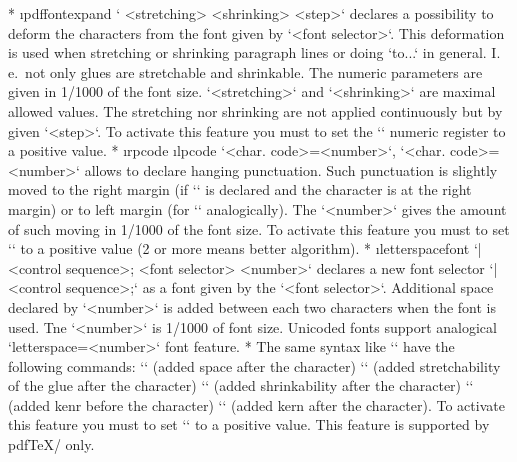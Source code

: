 {\begitems
* \i pdffontexpand 
  ` <stretching> <shrinking> <step>`
  declares a possibility to deform the characters from the font given by
  `<font selector>`. This deformation is used when stretching or shrinking
  paragraph lines or doing `\hbox to{...}` in general. I.\,e.\ not only glues are
  stretchable and shrinkable. The numeric parameters are given in 1/1000
  of the font size. `<stretching>` and `<shrinking>` are maximal allowed
  values. The stretching nor shrinking are not applied continuously but by
  given `<step>`.
  To activate this feature you must to set the \x`\pdfadjustspacing`
  numeric register to a positive value. 
* \i rpcode \i lpcode 
  `<char. code>=<number>`,
  `<char. code>=<number>` allows to declare
  hanging punctuation. Such punctuation is slightly moved to the right
  margin (if `\rpcode` is declared and the character is at the right margin) 
  or to left margin (for `\lpcode` analogically).
  The `<number>` gives the amount of such moving in 1/1000 of the font size.
  To activate this feature you must to set \x`\pdfprotrudechars` to
  a positive value (2 or more means better algorithm).
* \i letterspacefont
  ` |<control sequence>; <font selector> <number>`
  declares a new font selector `|<control sequence>;` as a font given by
  the `<font selector>`. Additional space declared by `<number>` is added
  between each two characters when the font is used. Tne `<number>` is 1/1000 of
  font size. Unicoded fonts support analogical
  `letterspace=<number>` font feature. 
* The same syntax like `\rpcode` have the following commands:
  \x`\knbscode` (added space after the character)
  \x`\stbscode` (added stretchability of the glue after the character)
  \x`\shbscode` (added shrinkability after the character)
  \x`\knbccode` (added kenr before the character)
  \x`\knaccode` (added kern after the character).
  To activate this feature you must to set
  \x`\pdfadjustinterwordglue` to a positive value.
  This feature is supported by pdf\TeX/ only.
\enditems


}
